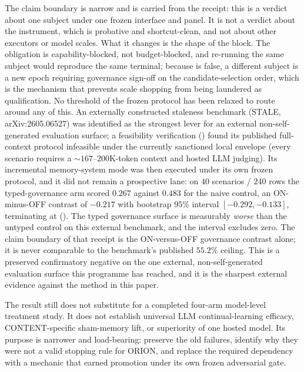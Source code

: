 The claim boundary is narrow and is carried from the receipt: this is a verdict about one subject under one frozen interface and panel. It is not a verdict about the instrument, which is probative and shortcut-clean, and not about other executors or model scales. What it changes is the shape of the block. The obligation is capability-blocked, not budget-blocked, and re-running the same subject would reproduce the same terminal; because  is false, a different subject is a new epoch requiring governance sign-off on the candidate-selection order, which is the mechanism that prevents scale shopping from being laundered as qualification. No threshold of the frozen protocol has been relaxed to route around any of this. An externally constructed staleness benchmark (STALE, arXiv:2605.06527) was identified as the strongest lever for an external non-self-generated evaluation surface; a feasibility verification () found its published full-context protocol infeasible under the currently sanctioned local envelope (every scenario requires a ${\sim}167$--$200$K-token context and hosted LLM judging). Its incremental memory-system mode was then executed under its own frozen protocol, and it did not remain a prospective lane: on $40$ scenarios / $240$ rows the typed-governance arm scored $0.267$ against $0.483$ for the naive control, an ON-minus-OFF contrast of $-0.217$ with bootstrap $95\%$ interval $[-0.292,-0.133]$, terminating at  (). The typed governance surface is measurably \emph{worse} than the untyped control on this external benchmark, and the interval excludes zero. The claim boundary of that receipt is the ON-versus-OFF governance contrast alone; it is never comparable to the benchmark's published $55.2\%$ ceiling. This is a preserved confirmatory negative on the one external, non-self-generated evaluation surface this programme has reached, and it is the sharpest external evidence against the method in this paper.

The result still does not substitute for a completed four-arm model-level treatment study. It does not establish universal LLM continual-learning efficacy, CONTENT-specific sham-memory lift, or superiority of one hosted model. Its purpose is narrower and load-bearing: preserve the old failures, identify why they were not a valid stopping rule for ORION, and replace the required dependency with a mechanic that earned promotion under its own frozen adversarial gate.

